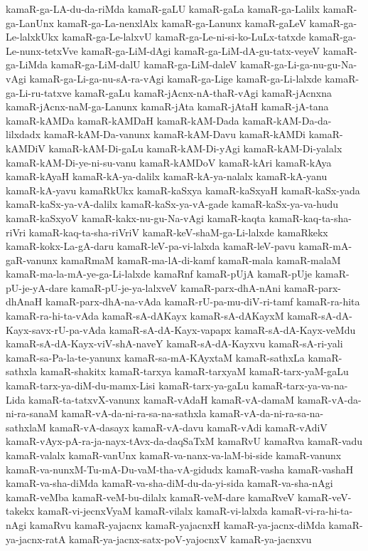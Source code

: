 {kamaR-ga-LA-du-da-riMda
kamaR-gaLU
kamaR-gaLa
kamaR-ga-Lalilx
kamaR-ga-LanUnx
kamaR-ga-La-nenxlAlx
kamaR-ga-Lanunx
kamaR-gaLeV
kamaR-ga-Le-lalxkUkx
kamaR-ga-Le-lalxvU
kamaR-ga-Le-ni-si-ko-LuLx-tatxde
kamaR-ga-Le-nunx-tetxVve
kamaR-ga-LiM-dAgi
kamaR-ga-LiM-dA-gu-tatx-veyeV
kamaR-ga-LiMda
kamaR-ga-LiM-dalU
kamaR-ga-LiM-daleV
kamaR-ga-Li-ga-nu-gu-Na-vAgi
kamaR-ga-Li-ga-nu-sA-ra-vAgi
kamaR-ga-Lige
kamaR-ga-Li-lalxde
kamaR-ga-Li-ru-tatxve
kamaR-gaLu
kamaR-jAcnx-nA-thaR-vAgi
kamaR-jAcnxna
kamaR-jAcnx-naM-ga-Lanunx
kamaR-jAta
kamaR-jAtaH
kamaR-jA-tana
kamaR-kAMDa
kamaR-kAMDaH
kamaR-kAM-Dada
kamaR-kAM-Da-da-lilxdadx
kamaR-kAM-Da-vanunx
kamaR-kAM-Davu
kamaR-kAMDi
kamaR-kAMDiV
kamaR-kAM-Di-gaLu
kamaR-kAM-Di-yAgi
kamaR-kAM-Di-yalalx
kamaR-kAM-Di-ye-ni-su-vanu
kamaR-kAMDoV
kamaR-kAri
kamaR-kAya
kamaR-kAyaH
kamaR-kA-ya-dalilx
kamaR-kA-ya-nalalx
kamaR-kA-yanu
kamaR-kA-yavu
kamaRkUkx
kamaR-kaSxya
kamaR-kaSxyaH
kamaR-kaSx-yada
kamaR-kaSx-ya-vA-dalilx
kamaR-kaSx-ya-vA-gade
kamaR-kaSx-ya-va-hudu
kamaR-kaSxyoV
kamaR-kakx-nu-gu-Na-vAgi
kamaR-kaqta
kamaR-kaq-ta-sha-riVri
kamaR-kaq-ta-sha-riVriV
kamaR-keV-shaM-ga-Li-lalxde
kamaRkekx
kamaR-kokx-La-gA-daru
kamaR-leV-pa-vi-lalxda
kamaR-leV-pavu
kamaR-mA-gaR-vanunx
kamaRmaM
kamaR-ma-lA-di-kamf
kamaR-mala
kamaR-malaM
kamaR-ma-la-mA-ye-ga-Li-lalxde
kamaRnf
kamaR-pUjA
kamaR-pUje
kamaR-pU-je-yA-dare
kamaR-pU-je-ya-lalxveV
kamaR-parx-dhA-nAni
kamaR-parx-dhAnaH
kamaR-parx-dhA-na-vAda
kamaR-rU-pa-mu-diV-ri-tamf
kamaR-ra-hita
kamaR-ra-hi-ta-vAda
kamaR-sA-dAKayx
kamaR-sA-dAKayxM
kamaR-sA-dA-Kayx-savx-rU-pa-vAda
kamaR-sA-dA-Kayx-vapapx
kamaR-sA-dA-Kayx-veMdu
kamaR-sA-dA-Kayx-viV-shA-naveY
kamaR-sA-dA-Kayxvu
kamaR-sA-ri-yali
kamaR-sa-Pa-la-te-yanunx
kamaR-sa-mA-KAyxtaM
kamaR-sathxLa
kamaR-sathxla
kamaR-shakitx
kamaR-tarxya
kamaR-tarxyaM
kamaR-tarx-yaM-gaLu
kamaR-tarx-ya-diM-du-mamx-Lisi
kamaR-tarx-ya-gaLu
kamaR-tarx-ya-va-na-Lida
kamaR-ta-tatxvX-vanunx
kamaR-vAdaH
kamaR-vA-damaM
kamaR-vA-da-ni-ra-sanaM
kamaR-vA-da-ni-ra-sa-na-sathxla
kamaR-vA-da-ni-ra-sa-na-sathxlaM
kamaR-vA-dasayx
kamaR-vA-davu
kamaR-vAdi
kamaR-vAdiV
kamaR-vAyx-pA-ra-ja-nayx-tAvx-da-daqSaTxM
kamaRvU
kamaRva
kamaR-vadu
kamaR-valalx
kamaR-vanUnx
kamaR-va-nanx-va-laM-bi-side
kamaR-vanunx
kamaR-va-nunxM-Tu-mA-Du-vaM-tha-vA-gidudx
kamaR-vasha
kamaR-vashaH
kamaR-va-sha-diMda
kamaR-va-sha-diM-du-da-yi-sida
kamaR-va-sha-nAgi
kamaR-veMba
kamaR-veM-bu-dilalx
kamaR-veM-dare
kamaRveV
kamaR-veV-takekx
kamaR-vi-jecnxVyaM
kamaR-vilalx
kamaR-vi-lalxda
kamaR-vi-ra-hi-ta-nAgi
kamaRvu
kamaR-yajacnx
kamaR-yajacnxH
kamaR-ya-jacnx-diMda
kamaR-ya-jacnx-ratA
kamaR-ya-jacnx-satx-poV-yajocnxV
kamaR-ya-jacnxvu
}
